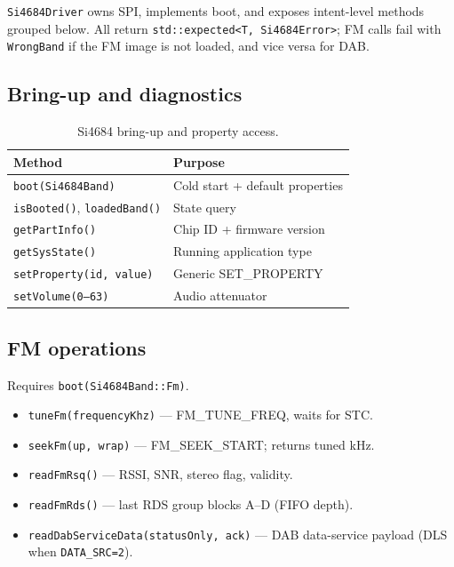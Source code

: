 \texttt{Si4684Driver} owns SPI, implements boot, and exposes intent-level
methods grouped below. All return \texttt{std::expected<T, Si4684Error>}; FM
calls fail with \texttt{WrongBand} if the FM image is not loaded, and vice
versa for DAB.

\subsection{Bring-up and diagnostics}

\begin{table}[htbp]
  \centering
  \begin{tabular}{@{}L{4.2cm}L{9.2cm}@{}}
    \toprule
    \textbf{Method} & \textbf{Purpose} \\
    \midrule
    \texttt{boot(Si4684Band)} & Cold start + default properties \\
    \texttt{isBooted()}, \texttt{loadedBand()} & State query \\
    \texttt{getPartInfo()} & Chip ID + firmware version \\
    \texttt{getSysState()} & Running application type \\
    \texttt{setProperty(id, value)} & Generic SET\_PROPERTY \\
    \texttt{setVolume(0--63)} & Audio attenuator \\
    \bottomrule
  \end{tabular}
  \caption{Si4684 bring-up and property access.}
\end{table}

\subsection{FM operations}

Requires \texttt{boot(Si4684Band::Fm)}.

\begin{itemize}
  \item \texttt{tuneFm(frequencyKhz)} --- FM\_TUNE\_FREQ, waits for STC.
  \item \texttt{seekFm(up, wrap)} --- FM\_SEEK\_START; returns tuned kHz.
  \item \texttt{readFmRsq()} --- RSSI, SNR, stereo flag, validity.
  \item \texttt{readFmRds()} --- last RDS group blocks A--D (FIFO depth).
  \item \texttt{readDabServiceData(statusOnly, ack)} --- DAB data-service
    payload (DLS when \texttt{DATA\_SRC=2}).
\end{itemize}


